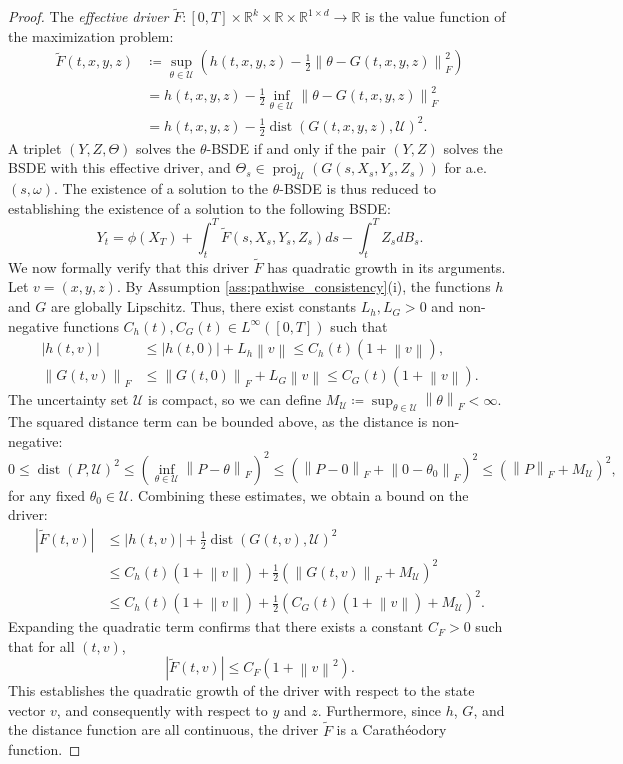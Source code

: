 \documentclass[12pt, letterpaper]{amsart}
\newcommand{\Ucal}{\mathcal{U}}
\newcommand{\R}{\mathbb{R}}
\newcommand{\norm}[1]{\left\lVert#1\right\rVert}
\newcommand{\abs}[1]{\left\lvert#1\right\rvert}
\DeclareMathOperator*{\dist}{dist}
\DeclareMathOperator*{\proj}{proj}
\theoremstyle{plain}
\theoremstyle{definition}
\theoremstyle{remark}
\numberwithin{equation}{section} %
\begin{document}
\begin{proof}
The \emph{effective driver} \(\tilde{F}: [0,T] \times \R^k \times \R \times \R^{1\times d} \to \R\) is the value function of the maximization problem:
\begin{align*}
    \tilde{F}(t,x,y,z) &\coloneqq \sup_{\theta \in \Ucal} \left( h(t,x,y,z) - \frac{1}{2}\norm{\theta - G(t,x,y,z)}_F^2 \right) \\
    &= h(t,x,y,z) - \frac{1}{2} \inf_{\theta \in \Ucal} \norm{\theta - G(t,x,y,z)}_F^2 \\
    &= h(t,x,y,z) - \frac{1}{2}\dist(G(t,x,y,z), \Ucal)^2.
\end{align*}
A triplet \((Y,Z,\Theta)\) solves the \(\theta\)-BSDE if and only if the pair \((Y,Z)\) solves the BSDE with this effective driver, and \(\Theta_s \in \proj_{\Ucal}(G(s,X_s,Y_s,Z_s))\) for a.e. \((s,\omega)\). The existence of a solution to the \(\theta\)-BSDE is thus reduced to establishing the existence of a solution to the following BSDE:
\begin{equation}\label{eq:effective_quadratic_bsde_app}
    Y_t = \phi(X_T) + \int_t^T \tilde{F}(s, X_s, Y_s, Z_s) ds - \int_t^T Z_s dB_s.
\end{equation}
We now formally verify that this driver \(\tilde{F}\) has quadratic growth in its arguments. Let \(v = (x,y,z)\). By Assumption \ref{ass:pathwise_consistency}(i), the functions \(h\) and \(G\) are globally Lipschitz. Thus, there exist constants \(L_h, L_G > 0\) and non-negative functions $C_h(t), C_G(t) \in L^\infty([0,T])$ such that
\begin{align*}
    \abs{h(t,v)} &\le \abs{h(t,0)} + L_h \norm{v} \le C_h(t)(1+\norm{v}), \\
    \norm{G(t,v)}_F &\le \norm{G(t,0)}_F + L_G \norm{v} \le C_G(t)(1+\norm{v}).
\end{align*}
The uncertainty set \(\Ucal\) is compact, so we can define \(M_\Ucal \coloneqq \sup_{\theta \in \Ucal} \norm{\theta}_F < \infty\). The squared distance term can be bounded above, as the distance is non-negative:
\[ 0 \le \dist(P, \Ucal)^2 \le \left( \inf_{\theta \in \Ucal} \norm{P-\theta}_F \right)^2 \le \left( \norm{P-0}_F + \norm{0-\theta_0}_F \right)^2 \le (\norm{P}_F + M_\Ucal)^2, \]
for any fixed \(\theta_0 \in \Ucal\). Combining these estimates, we obtain a bound on the driver:
\begin{align*}
    \abs{\tilde{F}(t,v)} &\le \abs{h(t,v)} + \frac{1}{2}\dist(G(t,v), \Ucal)^2 \\
    &\le C_h(t)(1+\norm{v}) + \frac{1}{2} \left( \norm{G(t,v)}_F + M_\Ucal \right)^2 \\
    &\le C_h(t)(1+\norm{v}) + \frac{1}{2} \left( C_G(t)(1+\norm{v}) + M_\Ucal \right)^2.
\end{align*}
Expanding the quadratic term confirms that there exists a constant \(C_F > 0\) such that for all \((t,v)\),
\[ \abs{\tilde{F}(t,v)} \le C_F(1 + \norm{v}^2). \]
This establishes the quadratic growth of the driver with respect to the state vector \(v\), and consequently with respect to \(y\) and \(z\). Furthermore, since \(h\), \(G\), and the distance function are all continuous, the driver \(\tilde{F}\) is a Carathéodory function.


\end{proof}
\end{document}
